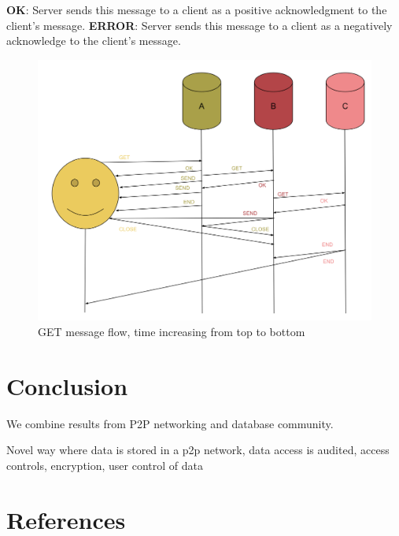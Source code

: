 \documentclass[preprint,10pt]{elsarticle}
\newcommand{\fscale}[1]{#1\linewidth}
\begin{document}
\textbf{OK}: Server sends this message to a client as a positive acknowledgment to the client's message.
\newline
\newline
\textbf{ERROR}: Server sends this message to a client as a negatively acknowledge to the client's message.
\begin{figure}[h!] \centering
	\includegraphics[width=\fscale{1}]{mx.png}
	\caption{GET message flow, time increasing from top to bottom}
	\label{fig:mx}
\end{figure}

\section{Conclusion}
We combine results from P2P networking and database community.

Novel way where data is stored in a p2p network, data access is audited, access controls, encryption, user control of data


\section{References}

\end{document}
